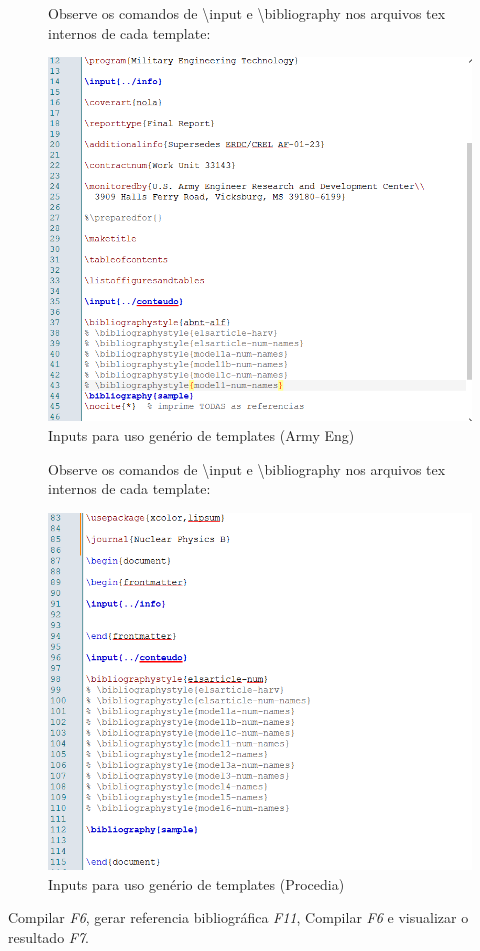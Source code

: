 \begin{frame}

\begin{figure}
Observe os comandos de \textbackslash input e \textbackslash bibliography nos arquivos tex internos de cada template:
\begin{center}
\includegraphics[scale=0.4]{figuras/armyInputs.png}
\caption{Inputs para uso genério de templates (Army Eng)}
\end{center}
\end{figure}
\end{frame}

\begin{frame}
\begin{figure}
Observe os comandos de \textbackslash input e \textbackslash bibliography nos arquivos tex internos de cada template:
\begin{center}
\includegraphics[scale=0.4]{figuras/cicInputs.png}
\caption{Inputs para uso genério de templates (Procedia)}
\end{center}
\end{figure}
\end{frame}


\begin{frame}[fragile]
Compilar \textit{F6}, gerar referencia bibliográfica \textit{F11},  Compilar \textit{F6} e visualizar o resultado \textit{F7}.
\end{frame}






